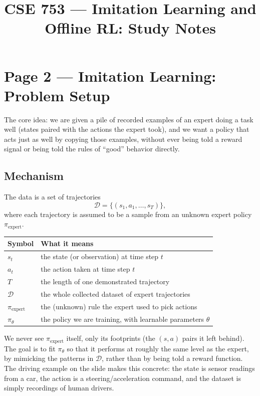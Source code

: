\documentclass[11pt]{article}
\title{CSE 753 --- Imitation Learning and Offline RL: Study Notes}
\author{}
\date{}
\begin{document}
\maketitle
\sloppy

\section*{Page 2 --- Imitation Learning: Problem Setup}

The core idea: we are given a pile of recorded examples of an expert doing a task well (states paired with the actions the expert took), and we want a policy that acts just as well by copying those examples, without ever being told a reward signal or being told the rules of ``good'' behavior directly.

\subsection*{Mechanism}

The data is a set of trajectories
\[
\mathcal{D} = \{(s_1, a_1, \dots, s_T)\},
\]
where each trajectory is assumed to be a sample from an unknown expert policy $\pi_{\text{expert}}$.

\begin{center}
\begin{tabular}{@{}ll@{}}
\toprule
Symbol & What it means \\
\midrule
$s_t$ & the state (or observation) at time step $t$ \\
$a_t$ & the action taken at time step $t$ \\
$T$ & the length of one demonstrated trajectory \\
$\mathcal{D}$ & the whole collected dataset of expert trajectories \\
$\pi_{\text{expert}}$ & the (unknown) rule the expert used to pick actions \\
$\pi_\theta$ & the policy we are training, with learnable parameters $\theta$ \\
\bottomrule
\end{tabular}
\end{center}

We never see $\pi_{\text{expert}}$ itself, only its footprints (the $(s,a)$ pairs it left behind). The goal is to fit $\pi_\theta$ so that it performs at roughly the same level as the expert, by mimicking the patterns in $\mathcal{D}$, rather than by being told a reward function. The driving example on the slide makes this concrete: the state is sensor readings from a car, the action is a steering/acceleration command, and the dataset is simply recordings of human drivers.
\end{document}

